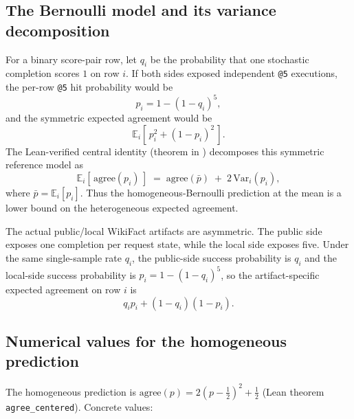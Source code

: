 \documentclass[11pt]{article}
\begin{document}
\subsection{The Bernoulli model and its variance decomposition}
\label{sec:tr-case-c-math}

For a binary score-pair row, let $q_i$ be the probability that one
  stochastic completion scores $1$ on row $i$.  If both sides exposed
  independent \texttt{@5} executions, the per-row \texttt{@5} hit
  probability would be
\[
  p_i = 1 - (1-q_i)^5,
\]
and the symmetric expected agreement would be
\[
  \mathbb{E}_i[\,p_i^2 + (1-p_i)^2\,].
\]
The Lean-verified central identity (theorem
  in ) decomposes this symmetric
  reference model as
\[
  \mathbb{E}_i[\,\text{agree}(p_i)\,]
  \;=\;
  \text{agree}(\bar p)
  \;+\; 2\,\mathrm{Var}_i(p_i),
\]
where $\bar p = \mathbb{E}_i[p_i]$.
Thus the homogeneous-Bernoulli prediction at the mean is a lower bound
  on the heterogeneous expected agreement.

The actual public/local WikiFact artifacts are asymmetric.  The public
  side exposes one completion per request state, while the local side
  exposes five.  Under the same single-sample rate $q_i$, the
  public-side success probability is $q_i$ and the local-side success
  probability is $p_i = 1-(1-q_i)^5$, so the artifact-specific expected
  agreement on row $i$ is
\[
  q_i p_i + (1-q_i)(1-p_i).
\]


\subsection{Numerical values for the homogeneous prediction}
\label{sec:tr-case-c-numerics}

The homogeneous prediction is
$\text{agree}(p) = 2(p - \tfrac{1}{2})^2 + \tfrac{1}{2}$
  (Lean theorem \texttt{agree\_centered}).
Concrete values:
\end{document}
